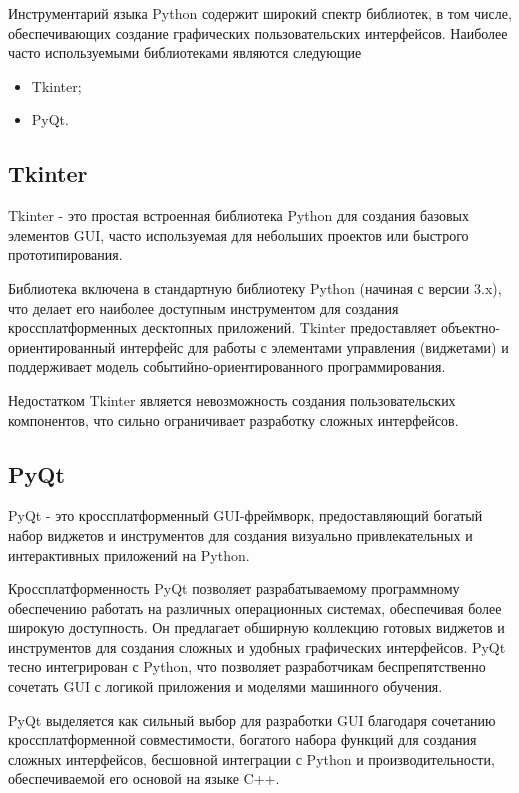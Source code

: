 Инструментарий языка Python содержит широкий спектр библиотек, в том числе, обеспечивающих создание графических пользовательских интерфейсов. 
Наиболее часто используемыми библиотеками являются следующие

\begin{itemize}
  \item Tkinter;
  \item PyQt.
\end{itemize}


\subsection{Tkinter}

Tkinter - это простая встроенная библиотека Python
для создания базовых элементов GUI, часто
используемая для небольших проектов или быстрого
прототипирования. 

Библиотека включена в стандартную библиотеку Python
(начиная с версии 3.x), что делает его наиболее
доступным инструментом для создания
кроссплатформенных десктопных приложений. Tkinter
предоставляет объектно-ориентированный интерфейс для
работы с элементами управления (виджетами) и
поддерживает модель событийно-ориентированного
программирования.

Недостатком Tkinter является невозможность создания пользовательских
компонентов, что сильно ограничивает разработку сложных интерфейсов.

\subsection{PyQt}

PyQt - это кроссплатформенный GUI-фреймворк,
предоставляющий богатый набор виджетов и
инструментов для создания визуально привлекательных
и интерактивных приложений на Python.

Кроссплатформенность PyQt позволяет разрабатываемому
программному обеспечению работать на различных
операционных системах, обеспечивая более широкую
доступность. Он предлагает обширную коллекцию
готовых виджетов и инструментов для создания сложных
и удобных графических интерфейсов. PyQt тесно
интегрирован с Python, что позволяет разработчикам
беспрепятственно сочетать GUI с логикой приложения и
моделями машинного обучения.

PyQt выделяется как сильный выбор для разработки GUI благодаря сочетанию
кроссплатформенной совместимости, богатого набора функций для создания сложных
интерфейсов, бесшовной интеграции с Python и производительности, обеспечиваемой
его основой на языке C++.

